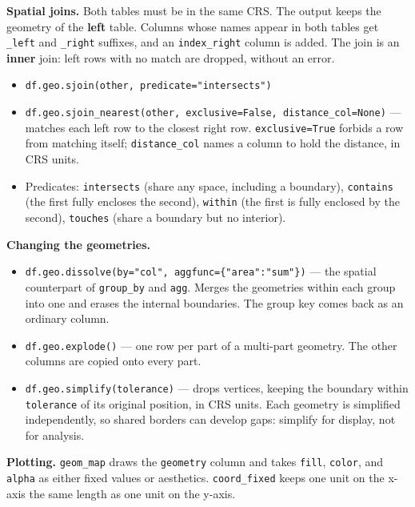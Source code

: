 \documentclass[11pt, a4paper]{article}
\newcommand{\code}[1]{\texttt{#1}}
\begin{document}
\smallskip

\textbf{Spatial joins.}
Both tables must be in the same CRS. The output keeps the geometry of the \textbf{left}
table. Columns whose names appear in both tables get \code{\_left} and \code{\_right}
suffixes, and an \code{index\_right} column is added. The join is an \textbf{inner} join:
left rows with no match are dropped, without an error.

\begin{itemize}
  \item \code{df.geo.sjoin(other, predicate="intersects")}
  \item \code{df.geo.sjoin\_nearest(other, exclusive=False, distance\_col=None)} --- matches
        each left row to the closest right row. \code{exclusive=True} forbids a row from
        matching itself; \code{distance\_col} names a column to hold the distance, in CRS
        units.
  \item Predicates: \code{intersects} (share any space, including a boundary),
        \code{contains} (the first fully encloses the second), \code{within} (the first is
        fully enclosed by the second), \code{touches} (share a boundary but no interior).
\end{itemize}

\smallskip

\textbf{Changing the geometries.}

\begin{itemize}
  \item \code{df.geo.dissolve(by="col", aggfunc=\{"area":"sum"\})} --- the spatial
        counterpart of \code{group\_by} and \code{agg}. Merges the geometries within each
        group into one and erases the internal boundaries. The group key comes back as an
        ordinary column.
  \item \code{df.geo.explode()} --- one row per part of a multi-part geometry. The other
        columns are copied onto every part.
  \item \code{df.geo.simplify(tolerance)} --- drops vertices, keeping the boundary within
        \code{tolerance} of its original position, in CRS units. Each geometry is
        simplified independently, so shared borders can develop gaps: simplify for display,
        not for analysis.
\end{itemize}

\smallskip

\textbf{Plotting.}
\code{geom\_map} draws the \code{geometry} column and takes \code{fill}, \code{color}, and
\code{alpha} as either fixed values or aesthetics. \code{coord\_fixed} keeps one unit on the
x-axis the same length as one unit on the y-axis.
\end{document}
